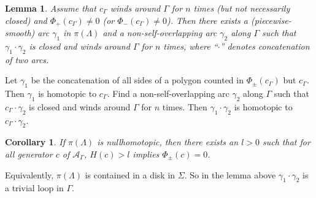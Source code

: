 \documentclass[11pt]{amsart}
\makeatletter
\renewenvironment{proof}[1][\proofname] {\par\pushQED{\qed}{\normalfont\bfseries\topsep6\p@\@plus6\p@\relax #1\@addpunct{.} }}{\popQED\endtrivlist\@endpefalse}
\theoremstyle{mystyle}
\newtheorem{lemma}[lemma]{Lemma}
\newtheorem{proposition}[proposition]{Proposition}
\newtheorem{corollary}[corollary]{Corollary}
\newcommand{\R}{\mathbb{R}}
\newcommand{\T}{\mathbb{T}}
\newcommand{\<}{\langle}
\renewcommand{\>}{\rangle}
\makeatother
\begin{document}
%     




\begin{lemma}\label{prop:homotopy finite}
    Assume that $c_\Gamma$ winds around $\Gamma$ for $n$ times (but not necessarily closed) and $\Phi_+(c_\Gamma) \neq 0$ (or $\Phi_-(c_\Gamma) \neq 0$). Then there exists a (piecewise-smooth) arc $\gamma_1$ in $\pi(\Lambda)$ and a non-self-overlapping arc $\gamma_2$ along $\Gamma$ such that $\gamma_1 \cdot \gamma_2$ is closed and winds around $\Gamma$ for $n$ times, where ``$\cdot$'' denotes concatenation of two arcs.
\end{lemma}

\begin{proof}
    Let $\gamma_1$ be the concatenation of all sides of a polygon counted in $\Phi_\pm(c_\Gamma)$ but $c_\Gamma$. Then $\gamma_1$ is homotopic to $c_\Gamma$. Find a non-self-overlapping arc $\gamma_2$ along $\Gamma$ such that $c_\Gamma \cdot \gamma_2$ is closed and winds around $\Gamma$ for $n$ times. Then $\gamma_1 \cdot \gamma_2$ is homotopic to $c_\Gamma \cdot \gamma_2$.
\end{proof}

\begin{corollary}\label{cor:homotopy finite}
    If $\pi(\Lambda)$ is nullhomotopic, then there exists an $l>0$ such that for all generator $c$ of $\mathcal{A}_\Gamma$, $H(c)>l$ implies $\Phi_\pm(c)=0$.
\end{corollary}

\begin{proof}
    Equivalently, $\pi(\Lambda)$ is contained in a disk in $\Sigma$. So in the lemma above $\gamma_1 \cdot \gamma_2$ is a trivial loop in $\Gamma$.
\end{proof}
\end{document}
